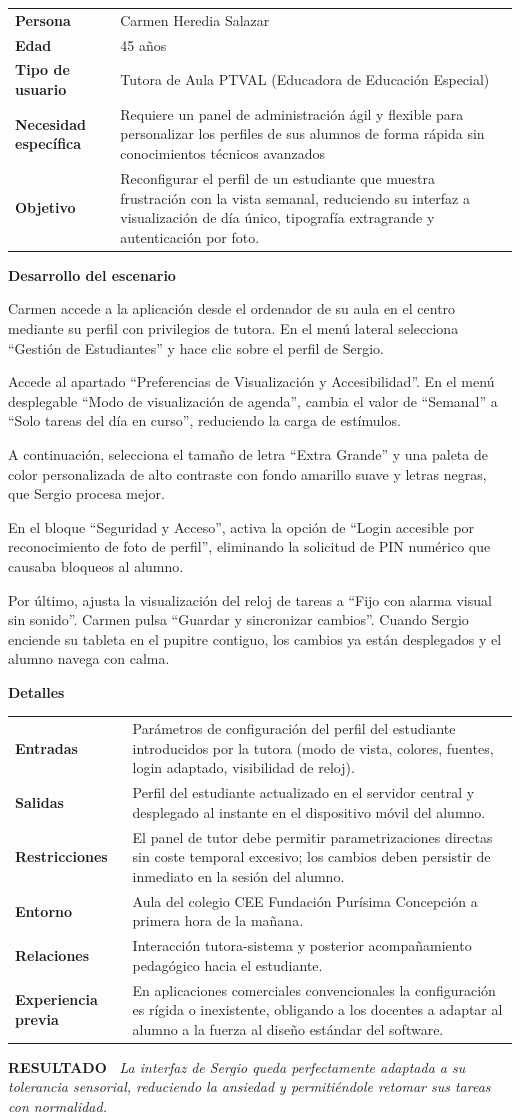 \documentclass[11pt,a4paper]{article}
\makeatletter
\newcommand{\escenariocard}[6]{%
\needspace{10\baselineskip}
\begin{tcolorbox}[breakable,enhanced,colback=white,colframe=brandgreen,boxrule=0.8pt,arc=3pt,
 left=9pt,right=9pt,top=7pt,bottom=7pt,before skip=10pt,after skip=10pt,
 title={\textbf{\color{white}ESCENARIO #1} \\[1pt] {\small\color{tintgreen}#2}},
 colbacktitle=brandgreen,coltitle=white,fonttitle=\bfseries,boxed title style={colframe=brandgreen}]
{\setlength{\parskip}{0pt}\renewcommand{\arraystretch}{1.35}\rowcolors{1}{tintgreen}{white}\arrayrulecolor{white}
\begin{tabular}{@{\hspace{4pt}}>{\bfseries\color{brandgreen}}p{3.4cm}p{11.4cm}@{}}
#3 \\
\end{tabular}}
\vspace{6pt}
\textbf{\color{brandblue}Desarrollo del escenario}\par\vspace{2pt}
#4
\par\vspace{4pt}
\textbf{\color{brandblue}Detalles}\par\vspace{2pt}
{\setlength{\parskip}{0pt}\renewcommand{\arraystretch}{1.35}\rowcolors{1}{tintblue}{white}\arrayrulecolor{white}
\begin{tabular}{@{\hspace{4pt}}>{\bfseries\color{brandblue}}p{3.4cm}p{11.4cm}@{}}
#5 \\
\end{tabular}}
\vspace{6pt}
\begin{tcolorbox}[colback=tintblue,colframe=brandblue,boxrule=0pt,sharp corners,borderline west={3pt}{0pt}{brandblue},left=8pt,right=8pt,top=5pt,bottom=5pt]
\textbf{\small\color{brandblue}RESULTADO\ } {\small\itshape #6}
\end{tcolorbox}
\end{tcolorbox}
}
\makeatother
\begin{document}
\escenariocard{7}{Ajuste del perfil y simplificación de la interfaz ante sobrecarga cognitiva}{%
Persona & Carmen Heredia Salazar \\
Edad & 45 años \\
Tipo de usuario & Tutora de Aula PTVAL (Educadora de Educación Especial) \\
Necesidad específica & Requiere un panel de administración ágil y flexible para personalizar los perfiles de sus alumnos de forma rápida sin conocimientos técnicos avanzados \\
Objetivo & Reconfigurar el perfil de un estudiante que muestra frustración con la vista semanal, reduciendo su interfaz a visualización de día único, tipografía extragrande y autenticación por foto.
}{%
Carmen accede a la aplicación desde el ordenador de su aula en el centro mediante su perfil con privilegios de tutora. En el menú lateral selecciona ``Gestión de Estudiantes'' y hace clic sobre el perfil de Sergio.

Accede al apartado ``Preferencias de Visualización y Accesibilidad''. En el menú desplegable ``Modo de visualización de agenda'', cambia el valor de ``Semanal'' a ``Solo tareas del día en curso'', reduciendo la carga de estímulos.

A continuación, selecciona el tamaño de letra ``Extra Grande'' y una paleta de color personalizada de alto contraste con fondo amarillo suave y letras negras, que Sergio procesa mejor.

En el bloque ``Seguridad y Acceso'', activa la opción de ``Login accesible por reconocimiento de foto de perfil'', eliminando la solicitud de PIN numérico que causaba bloqueos al alumno.

Por último, ajusta la visualización del reloj de tareas a ``Fijo con alarma visual sin sonido''. Carmen pulsa ``Guardar y sincronizar cambios''. Cuando Sergio enciende su tableta en el pupitre contiguo, los cambios ya están desplegados y el alumno navega con calma.
}{%
Entradas & Parámetros de configuración del perfil del estudiante introducidos por la tutora (modo de vista, colores, fuentes, login adaptado, visibilidad de reloj). \\
Salidas & Perfil del estudiante actualizado en el servidor central y desplegado al instante en el dispositivo móvil del alumno. \\
Restricciones & El panel de tutor debe permitir parametrizaciones directas sin coste temporal excesivo; los cambios deben persistir de inmediato en la sesión del alumno. \\
Entorno & Aula del colegio CEE Fundación Purísima Concepción a primera hora de la mañana. \\
Relaciones & Interacción tutora-sistema y posterior acompañamiento pedagógico hacia el estudiante. \\
Experiencia previa & En aplicaciones comerciales convencionales la configuración es rígida o inexistente, obligando a los docentes a adaptar al alumno a la fuerza al diseño estándar del software.
}{La interfaz de Sergio queda perfectamente adaptada a su tolerancia sensorial, reduciendo la ansiedad y permitiéndole retomar sus tareas con normalidad.}
\end{document}
